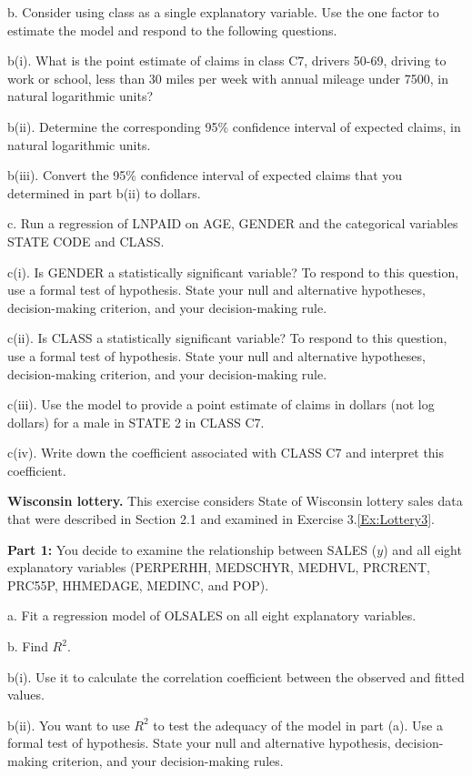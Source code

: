 \begin{exercises}
b. Consider using class as a single explanatory variable. Use the
one factor to estimate the model and respond to the following
questions.

b(i). What is the point estimate of claims in class C7, drivers
50-69, driving to work or school, less than 30 miles per week with
annual mileage under 7500, in natural logarithmic units?

b(ii). Determine the corresponding 95\% confidence interval of
expected claims, in natural logarithmic units.

b(iii). Convert the 95\% confidence interval of expected claims that
you determined in part b(ii) to dollars.

c. Run a regression of LNPAID on AGE, GENDER and the categorical
variables STATE CODE and CLASS.

c(i). Is GENDER a statistically significant variable? To respond to
this question, use a formal test of hypothesis. State your null and
alternative hypotheses, decision-making criterion, and your
decision-making rule.

c(ii). Is CLASS a statistically significant variable? To respond to
this question, use a formal test of hypothesis. State your null and
alternative hypotheses, decision-making criterion, and your
decision-making rule.

c(iii). Use the model to provide a point estimate of claims in
dollars (not log dollars) for a male in STATE 2 in CLASS C7.

c(iv). Write down the coefficient associated with CLASS C7 and
interpret this coefficient.


\item \textbf{Wisconsin lottery.}\label{Ex:Lottery4}
This exercise considers State of Wisconsin lottery sales data that
were described in Section 2.1 and examined in Exercise
3.\ref{Ex:Lottery3}.

\textbf{Part 1:} You decide to examine the relationship between
SALES ($y$) and all eight explanatory variables (PERPERHH, MEDSCHYR,
MEDHVL, PRCRENT, PRC55P, \newline HHMEDAGE, MEDINC, and POP).

a. Fit a regression model of OLSALES on all eight explanatory
variables.

b. Find $R^2$.

b(i). Use it to calculate the correlation coefficient between the
observed and fitted values.

b(ii). You want to use $R^2$ to test the adequacy of the model in
part (a). Use a formal test of hypothesis. State your null and
alternative hypothesis, decision-making criterion, and your
decision-making rules.


\end{exercises}
